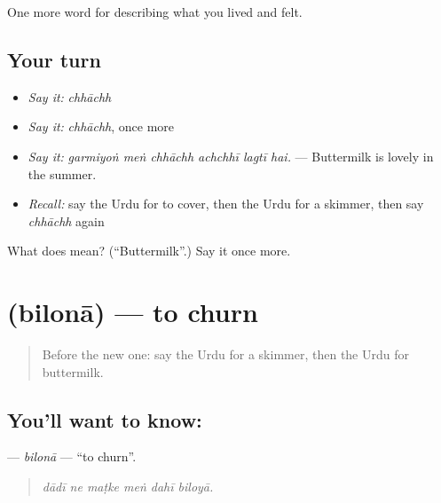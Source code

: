 \begin{grammarlens}[title={What you've built}]
One more word for describing what you lived and felt.
\end{grammarlens}

\subsection*{Your turn}
\begin{itemize}
\raggedright
  \item \emph{Say it:} \emph{chhāchh}
  \item \emph{Say it:} \emph{chhāchh}, once more
  \item \emph{Say it:} \emph{garmiyoṅ meṅ chhāchh achchhī lagtī hai.} — Buttermilk is lovely in the summer.
  \item \emph{Recall:} say the Urdu for to cover, then the Urdu for a skimmer, then say \emph{chhāchh} again
\end{itemize}

\begin{tcolorbox}[breakable,colback=teal!4,colframe=teal!35!black,title={Before you move on}]
What does  mean? (\textquotedblleft{}Buttermilk\textquotedblright{}.) Say it once more.
\end{tcolorbox}
\section[\texorpdfstring{\ur{بلونا} (bilonā)}{بلونا (bilonā)}]{ (bilonā) — to churn}

\label{lesson:UR-C509-bilona}



\begin{quote}
Before the new one: say the Urdu for a skimmer, then the Urdu for buttermilk.
\end{quote}

\subsection*{You'll want to know: }
\textbf{} — \emph{bilonā} — \textquotedblleft{}to churn\textquotedblright{}.

\begin{quote}
     
\end{quote}

\begin{quote}
\emph{dādī ne maṭke meṅ dahī biloyā.}
\end{quote}

